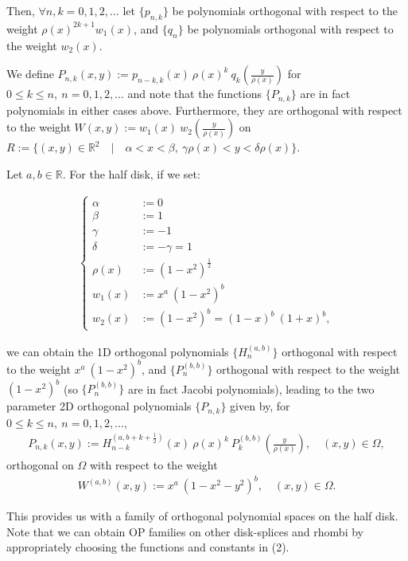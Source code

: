\documentclass[11pt, oneside]{article}   	%
\newcommand{\half}{\frac{1}{2}}
\newcommand{\R}{\mathbb{R}}
\newcommand{\Pnk}{P_{n,k}}
\begin{document}
Then, \(\forall n,k = 0,1,2,\dots\) let \(\{p_{n,k}\}\) be polynomials orthogonal with respect to the weight \(\rho(x)^{2k+1} w_1(x)\), and \(\{q_{n}\}\) be polynomials orthogonal with respect to the weight \(w_2(x)\).

We define \(\Pnk(x,y) := p_{n-k,k}(x) \: \rho(x)^k \: q_k(\frac{y}{\rho(x)})\) for \( 0 \le k \le n, \: n = 0,1,2,\dots\) and note that the functions \(\{\Pnk\}\) are in fact polynomials in either cases above. Furthermore, they are orthogonal with respect to the weight \(W(x,y) := w_1(x) \: w_2(\frac{y}{\rho(x)}) \) on \(R := \{(x,y) \in \R^2 \quad | \quad \alpha < x < \beta, \: \gamma \rho(x) < y < \delta \rho(x)\}\).

Let \(a, b \in \R\). For the half disk, if we set:

\begin{align}
\begin{cases}
\alpha &:= 0 \\
\beta &:= 1 \\
\gamma &:= -1 \\
\delta &:= -\gamma = 1 \\
\rho(x) &:= (1-x^2)^{\half} \\
w_1(x) &:= x^a \: (1-x^2)^b \\
w_2(x) &:= (1-x^2)^b = (1-x)^b \: (1+x)^b,
\end{cases}
\end{align}

we can obtain the 1D orthogonal polynomials \(\{H_n^{(a, b)}\}\) orthogonal with respect to the weight \(x^a \: (1-x^2)^b\), and \(\{P_n^{(b, b)}\}\) orthogonal with respect to the weight \((1-x^2)^b\) (so \(\{P_n^{(b, b)}\}\) are in fact Jacobi polynomials), leading to the two parameter 2D orthogonal polynomials \(\{\Pnk\}\) given by, for \(0 \le k \le n, \: n = 0,1,2,\dots,\)
\begin{align}
 \Pnk(x,y) := H_{n-k}^{(a, b+k+\half)}(x) \: \rho(x)^k \: P_k^{(b,b)}(\frac{y}{\rho(x)}), \quad (x,y) \in \Omega, 
\end{align}
orthogonal on \(\Omega\) with respect to the weight 
\begin{align}
W^{(a,b)}(x,y) := x^a \: (1-x^2-y^2)^b, \quad (x,y) \in \Omega.
\end{align}

This provides us with a family of orthogonal polynomial spaces on the half disk. Note that we can obtain OP families on other disk-splices and rhombi by appropriately choosing the functions and constants in (2).
\end{document}
